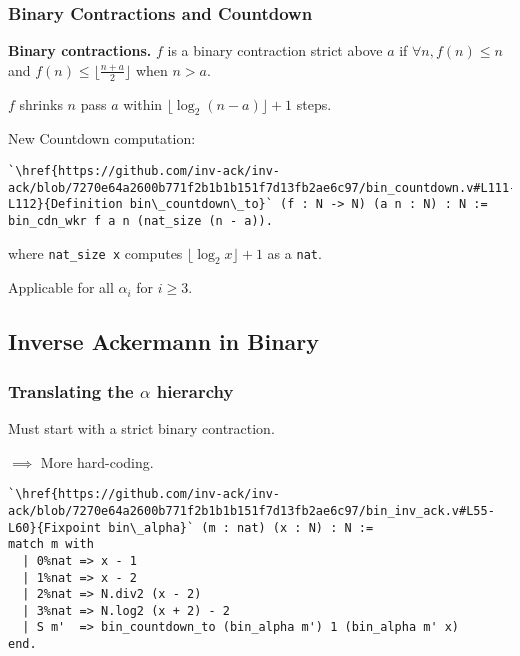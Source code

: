 \begin{frame}[fragile]
\frametitle{Binary Contractions and Countdown}

\textbf{Binary contractions.} $f$ is a binary contraction strict above $a$ if $\forall n, f(n)\le n$ and $f(n)\le \lfloor \frac{n+ a}{2} \rfloor$ when $n > a$.

\smallskip

$f$ shrinks $n$ pass $a$ within $\lfloor\log_2(n - a) \rfloor + 1$ steps.

\bigskip

New Countdown computation:
\begin{lstlisting}
`\href{https://github.com/inv-ack/inv-ack/blob/7270e64a2600b771f2b1b1b151f7d13fb2ae6c97/bin_countdown.v#L111-L112}{Definition bin\_countdown\_to}` (f : N -> N) (a n : N) : N :=
bin_cdn_wkr f a n (nat_size (n - a)).
\end{lstlisting}

where \texttt{nat\_size x} computes $\lfloor \log_2x \rfloor + 1$ as a \texttt{nat}.

\bigskip

Applicable for all $\alpha_i$ for $i \ge 3$.
 
\end{frame}


\subsection{Inverse Ackermann in Binary}

\begin{frame}[fragile]
\frametitle{Translating the $\alpha$ hierarchy}

Must start with a strict binary contraction.

$\implies$ More hard-coding.

\bigskip

\begin{lstlisting}
`\href{https://github.com/inv-ack/inv-ack/blob/7270e64a2600b771f2b1b1b151f7d13fb2ae6c97/bin_inv_ack.v#L55-L60}{Fixpoint bin\_alpha}` (m : nat) (x : N) : N :=
match m with
  | 0%nat => x - 1          
  | 1%nat => x - 2
  | 2%nat => N.div2 (x - 2) 
  | 3%nat => N.log2 (x + 2) - 2
  | S m'  => bin_countdown_to (bin_alpha m') 1 (bin_alpha m' x)
end.
\end{lstlisting}

\end{frame}


